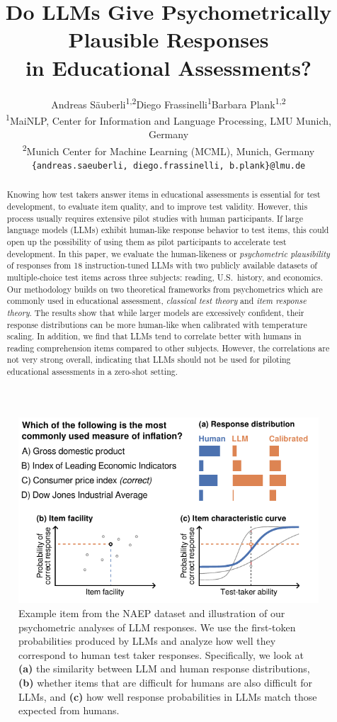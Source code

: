 \documentclass[11pt]{article}
\title{Do LLMs Give Psychometrically Plausible Responses \\ in Educational Assessments?}
\author{
  Andreas Säuberli\textsuperscript{1,2}\hspace{1cm}Diego Frassinelli\textsuperscript{1}\hspace{1cm}Barbara Plank\textsuperscript{1,2} \\
  \textsuperscript{1}MaiNLP, Center for Information and Language Processing, LMU Munich, Germany \\
  \textsuperscript{2}Munich Center for Machine Learning (MCML), Munich, Germany \\
  \texttt{\{andreas.saeuberli, diego.frassinelli, b.plank\}@lmu.de}
}
\begin{document}
\maketitle
\begin{abstract}
  Knowing how test takers answer items in educational assessments is essential for test development, to evaluate item quality, and to improve test validity. However, this process usually requires extensive pilot studies with human participants. If large language models (LLMs) exhibit human-like response behavior to test items, this could open up the possibility of using them as pilot participants to accelerate test development. In this paper, we evaluate the human-likeness or \emph{psychometric plausibility} of responses from 18 instruction-tuned LLMs with two publicly available datasets of multiple-choice test items across three subjects: reading, U.S.\ history, and economics. Our methodology builds on two theoretical frameworks from psychometrics which are commonly used in edu\-cational assessment, \emph{classical test theory} and \emph{item response theory}. The results show that while larger models are excessively confident, their response distributions can be more human-like when calibrated with temperature scaling. In addition, we find that LLMs tend to correlate better with humans in reading comprehension items compared to other subjects. However, the correlations are not very strong overall, indicating that LLMs should not be used for piloting educational assessments in a zero-shot setting.
\end{abstract}


\begin{figure}
  \centering
  \includegraphics[width=\columnwidth]{figures/example.pdf}
  \caption{Example item from the NAEP dataset and illustration of our psychometric analyses of LLM responses. We use the first-token probabilities produced by LLMs and analyze how well they correspond to human test taker responses. Specifically, we look at \textbf{(a)} the similarity between LLM and human response distributions, \textbf{(b)} whether items that are difficult for humans are also difficult for LLMs, and \textbf{(c)} how well response probabilities in LLMs match those expected from humans.}
  \label{fig:example}
\end{figure}
\end{document}
